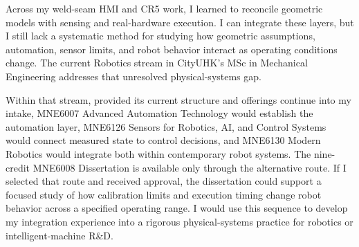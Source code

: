 Across my weld-seam HMI and CR5 work, I learned to reconcile geometric models with sensing and real-hardware execution. I can integrate these layers, but I still lack a systematic method for studying how geometric assumptions, automation, sensor limits, and robot behavior interact as operating conditions change. The current Robotics stream in CityUHK's MSc in Mechanical Engineering addresses that unresolved physical-systems gap.

Within that stream, provided its current structure and offerings continue into my intake, MNE6007 Advanced Automation Technology would establish the automation layer, MNE6126 Sensors for Robotics, AI, and Control Systems would connect measured state to control decisions, and MNE6130 Modern Robotics would integrate both within contemporary robot systems. The nine-credit MNE6008 Dissertation is available only through the alternative route. If I selected that route and received approval, the dissertation could support a focused study of how calibration limits and execution timing change robot behavior across a specified operating range. I would use this sequence to develop my integration experience into a rigorous physical-systems practice for robotics or intelligent-machine R\&D.
